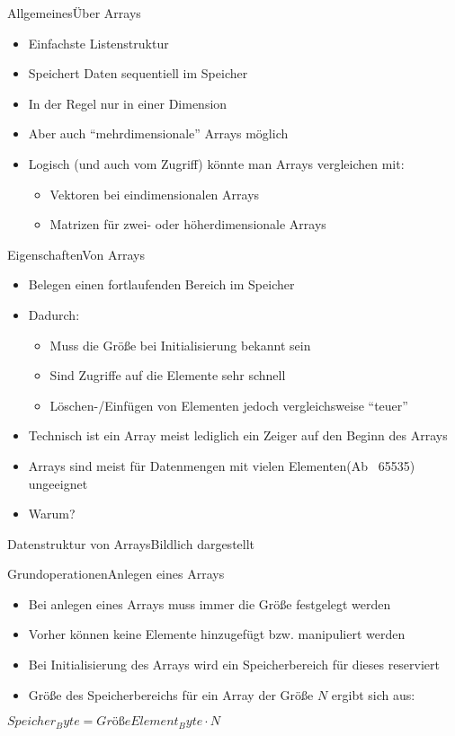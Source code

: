 \begin{frame}{Allgemeines}{Über Arrays}
	\begin{itemize}
		\item Einfachste Listenstruktur
		\item Speichert Daten sequentiell im Speicher
		\item In der Regel nur in einer Dimension
		\item Aber auch "`mehrdimensionale"' Arrays möglich
		\item Logisch (und auch vom Zugriff) könnte man Arrays vergleichen mit:
		\begin{itemize}
			\item Vektoren bei eindimensionalen Arrays
			\item Matrizen für zwei- oder höherdimensionale Arrays
		\end{itemize}
	\end{itemize}
\end{frame}

\begin{frame}{Eigenschaften}{Von Arrays}
	\begin{itemize}
		\item Belegen einen fortlaufenden Bereich im Speicher
		\item Dadurch:
		\begin{itemize}
			\item Muss die Größe bei Initialisierung bekannt sein
			\item Sind Zugriffe auf die Elemente sehr schnell
			\item Löschen-/Einfügen von Elementen jedoch vergleichsweise "`teuer"'
		\end{itemize}
		\item Technisch ist ein Array meist lediglich ein Zeiger auf den Beginn des Arrays
		\item Arrays sind meist für Datenmengen mit vielen Elementen(Ab ~65535) ungeeignet
		\item Warum?
	\end{itemize}
\end{frame}

\begin{frame}{Datenstruktur von Arrays}{Bildlich dargestellt}
\end{frame}

\begin{frame}{Grundoperationen}{Anlegen eines Arrays}
	\begin{itemize}
		\item Bei anlegen eines Arrays muss immer die Größe festgelegt werden
		\item Vorher können keine Elemente hinzugefügt bzw. manipuliert werden
		\item Bei Initialisierung des Arrays wird ein Speicherbereich für dieses reserviert
		\item Größe des Speicherbereichs für ein Array der Größe $N$ ergibt sich aus:
	\end{itemize}
	$Speicher_Byte=GrößeElement_Byte\cdot N$
\end{frame}

